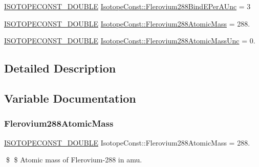 \begin{DoxyCompactItemize}
\mbox{\hyperlink{group___isotope_const-_macros_ga8f45a7272ce02c0b4c65c44636ed719a}{I\+S\+O\+T\+O\+P\+E\+C\+O\+N\+S\+T\+\_\+\+D\+O\+U\+B\+LE}} \mbox{\hyperlink{group___isotope_const-_flerovium-_fl288_ga128c6b190ba4b7621e46eb5094ed1b0e}{Isotope\+Const\+::\+Flerovium288\+Bind\+E\+Per\+A\+Unc}} = 3
\item 
\mbox{\hyperlink{group___isotope_const-_macros_ga8f45a7272ce02c0b4c65c44636ed719a}{I\+S\+O\+T\+O\+P\+E\+C\+O\+N\+S\+T\+\_\+\+D\+O\+U\+B\+LE}} \mbox{\hyperlink{group___isotope_const-_flerovium-_fl288_gafc65cff9917bff72dce8178c8cf1868a}{Isotope\+Const\+::\+Flerovium288\+Atomic\+Mass}} = 288.
\item 
\mbox{\hyperlink{group___isotope_const-_macros_ga8f45a7272ce02c0b4c65c44636ed719a}{I\+S\+O\+T\+O\+P\+E\+C\+O\+N\+S\+T\+\_\+\+D\+O\+U\+B\+LE}} \mbox{\hyperlink{group___isotope_const-_flerovium-_fl288_ga00d40bbb5bb5f06b7a4c0773b2aa607f}{Isotope\+Const\+::\+Flerovium288\+Atomic\+Mass\+Unc}} = 0.
\end{DoxyCompactItemize}


\subsection{Detailed Description}


\subsection{Variable Documentation}
\mbox{\label{group___isotope_const-_flerovium-_fl288_gafc65cff9917bff72dce8178c8cf1868a}} 
\subsubsection{\texorpdfstring{Flerovium288\+Atomic\+Mass}{Flerovium288AtomicMass}}
{\footnotesize\ttfamily \mbox{\hyperlink{group___isotope_const-_macros_ga8f45a7272ce02c0b4c65c44636ed719a}{I\+S\+O\+T\+O\+P\+E\+C\+O\+N\+S\+T\+\_\+\+D\+O\+U\+B\+LE}} Isotope\+Const\+::\+Flerovium288\+Atomic\+Mass = 288.}

\$ \$ Atomic mass of Flerovium-\/288 in amu. \mbox{\label{group___isotope_const-_flerovium-_fl288_ga00d40bbb5bb5f06b7a4c0773b2aa607f}} 
